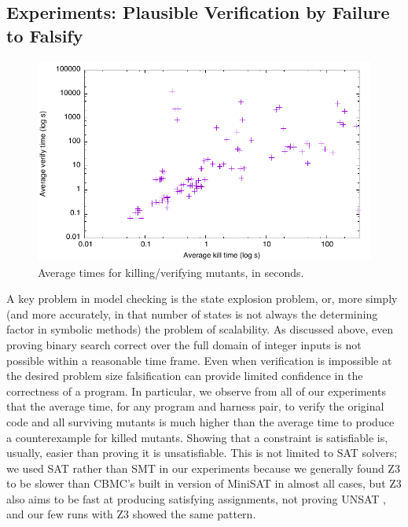 \documentclass[conference]{IEEEtran}
\begin{document}

\subsection{Experiments: Plausible Verification by Failure to Falsify}
\label{sec:sattimes}

\begin{figure}
\includegraphics[width=\columnwidth]{sattimes}
\caption{Average times for killing/verifying mutants, in seconds.}
\label{fig:sattimes}
\end{figure}

A key problem in model checking is the state explosion problem, or,
more simply (and more accurately, in that number of states is not
always the determining factor in symbolic methods) the problem of
scalability.  As discussed above, even proving binary search correct
over the full domain of integer inputs is not possible within a
reasonable time frame.  Even when verification is impossible at the
desired problem size falsification can provide limited
confidence in the correctness of a program.  In particular, we observe
from all of our experiments that the average time, for any program and
harness pair, to verify the original code and all surviving mutants is
much higher than the average time to produce a counterexample
for killed mutants.  Showing that a constraint is satisfiable is,
usually, easier than proving it is unsatisfiable.  This is not limited
to SAT solvers; we used SAT rather than SMT in our experiments because
we generally found Z3 to be slower than CBMC's built in version of
MiniSAT\cite{minisat} in almost all cases, but Z3 also
aims to be fast at producing satisfying assignments, not proving UNSAT
\cite{z3}, and our few runs with Z3 showed the same pattern.
\end{document}
